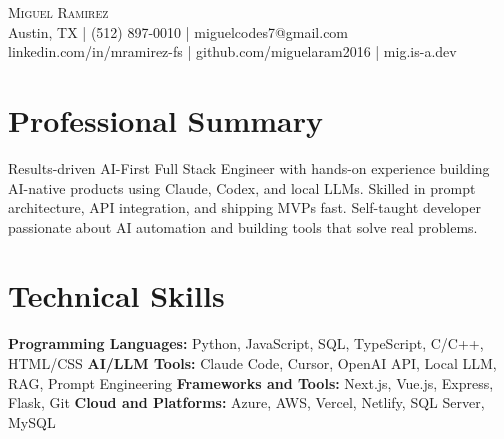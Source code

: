 \documentclass[letterpaper,10pt]{article}
\begin{document}
\begin{center}
  {\Large \scshape Miguel Ramirez} \\ \vspace{0pt}
  Austin, TX | (512) 897-0010 | miguelcodes7@gmail.com \\ 
  linkedin.com/in/mramirez-fs | github.com/miguelaram2016 | mig.is-a.dev
\end{center}

\section*{Professional Summary}
Results-driven AI-First Full Stack Engineer with hands-on experience building AI-native products using Claude, Codex, and local LLMs. Skilled in prompt architecture, API integration, and shipping MVPs fast. Self-taught developer passionate about AI automation and building tools that solve real problems.

\section*{Technical Skills}
\textbf{Programming Languages:} Python, JavaScript, SQL, TypeScript, C/C++, HTML/CSS \newline
\textbf{AI/LLM Tools:} Claude Code, Cursor, OpenAI API, Local LLM, RAG, Prompt Engineering \newline
\textbf{Frameworks and Tools:} Next.js, Vue.js, Express, Flask, Git \newline
\textbf{Cloud and Platforms:} Azure, AWS, Vercel, Netlify, SQL Server, MySQL

\end{document}
